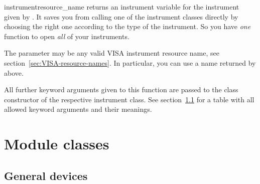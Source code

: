\documentclass{howto}
\begin{document}
\begin{funcdesc}{instrument}{resource_name}
  returns an instrument variable for the instrument given by
  .  It saves you from calling one of the instrument classes
  directly by choosing the right one according to the type of the instrument.
  So you have \emph{one} function to open \emph{all} of your instruments.

  The parameter  may be any valid VISA instrument resource
  name, see section~\ref{sec:VISA-resource-names}.  In particular, you can use
  a name returned by  above.

  All further keyword arguments given to this function are passed to the class
  constructor of the respective instrument class.  See
  section~\ref{sec:general-devices} for a table with all allowed keyword
  arguments and their meanings.
\end{funcdesc}


\section{Module classes}

\subsection{General devices}
\label{sec:general-devices}
\end{document}
